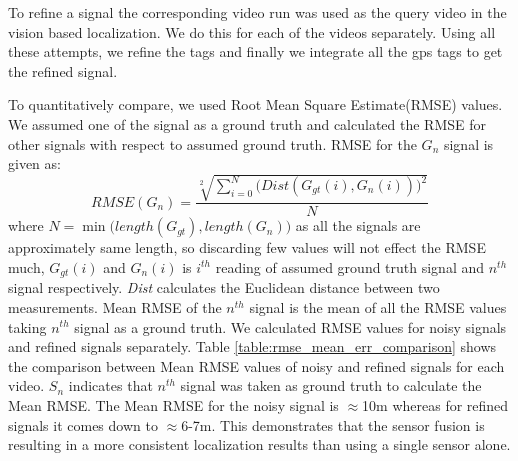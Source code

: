 To refine a \gps signal the corresponding video run was used 
as the query video in the vision based localization. We do this for
each of the videos separately.
Using all these attempts, we refine the 
\gps tags and finally we integrate all the {\sc gps} tags to
get the refined \gps signal.

 To quantitatively compare, we used Root Mean Square
Estimate(RMSE) values. We assumed one of the \gps signal 
as a ground truth and calculated the RMSE for other signals with respect
to assumed ground truth. RMSE for the $G_n$ \gps signal is given as:
\begin{equation}
RMSE(G_n) = \frac{ \sqrt[2] {\sum_{i=0}^{N} \Big( \textit{Dist}(G_{gt}(i),G_n(i)) \Big )^2 } } {N}
\end{equation}
where  $ N = \min \big( length(G_{gt}),length(G_n) \big) $ as all the signals are approximately same
length, so discarding few values will not effect the RMSE much,  $G_{gt}(i)$ and $G_n(i)$ is
$i^{th}$ \gps reading of assumed ground truth signal and $n^{th}$ \gps signal
respectively. \textit{Dist} calculates the Euclidean distance between two \gps measurements. Mean
RMSE of the $n^{th}$ \gps signal is the mean of all the RMSE values taking $n^{th}$ signal as a
ground truth. We calculated RMSE values for noisy \gps signals and refined \gps signals
separately. Table \ref{table:rmse_mean_err_comparison} shows the comparison between Mean RMSE values
of noisy and refined \gps signals for each video.   $S_n$ indicates that $n^{th}$ signal was taken as 
ground truth to calculate the Mean RMSE. The Mean RMSE for the noisy \gps signal is $\approx$10m 
whereas for refined \gps signals it comes down to $\approx$6-7m. This demonstrates that the sensor fusion is resulting in a more consistent localization results than using a single sensor alone.

